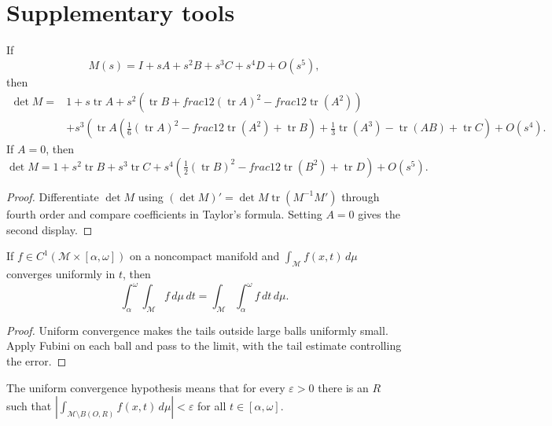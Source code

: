 \section{Supplementary tools}

\begin{lemma}
\label{lem:chow-iii-ch23-determinant-expansion}
If
\[
M(s)=I+sA+s^2B+s^3C+s^4D+O(s^5),
\]
then
\[
\begin{aligned}
\det M={}&1+s\operatorname{tr}A+s^2\left(\operatorname{tr}B+	frac12(\operatorname{tr}A)^2-	frac12\operatorname{tr}(A^2)\right)\\
&+s^3\left(\operatorname{tr}A(\tfrac16(\operatorname{tr}A)^2-	frac12\operatorname{tr}(A^2)+\operatorname{tr}B)+\tfrac13\operatorname{tr}(A^3)-\operatorname{tr}(AB)+\operatorname{tr}C\right)+O(s^4).
\end{aligned}
\]
If $A=0$, then
\[
\det M=1+s^2\operatorname{tr}B+s^3\operatorname{tr}C+s^4\left(\tfrac12(\operatorname{tr}B)^2-	frac12\operatorname{tr}(B^2)+\operatorname{tr}D\right)+O(s^5).
\]
\end{lemma}
\begin{proof}
\sketch Differentiate $\det M$ using
\( (\det M)'=\det M\operatorname{tr}(M^{-1}M')\) through fourth order and
compare coefficients in Taylor's formula.  Setting $A=0$ gives the second
display.
\end{proof}

\begin{lemma}
\label{lem:chow-iii-ch23-fubini-noncompact}
If $f\in C^1(\mathcal M\times[\alpha,\omega])$ on a noncompact manifold and
\(\int_{\mathcal M}f(x,t)\,d\mu\) converges uniformly in $t$, then
\[
\int_\alpha^\omega\int_{\mathcal M}f\,d\mu\,dt
=\int_{\mathcal M}\int_\alpha^\omega f\,dt\,d\mu.
\]
\end{lemma}
\begin{proof}
\sketch Uniform convergence makes the tails outside large balls uniformly small.  Apply
Fubini on each ball and pass to the limit, with the tail estimate controlling
the error.
\end{proof}

\begin{remark}
\label{rem:chow-iii-ch23-fubini-tail}
The uniform convergence hypothesis means that for every $\varepsilon>0$ there
is an $R$ such that
\(\left|\int_{\mathcal M\setminus B(O,R)}f(x,t)\,d\mu\right|<\varepsilon\)
for all $t\in[\alpha,\omega]$.
\end{remark}

